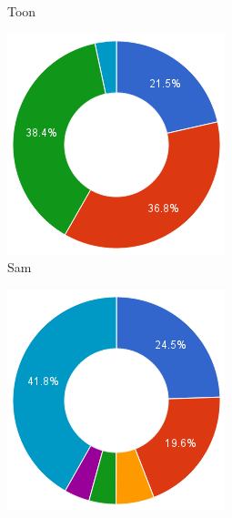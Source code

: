 \documentclass[eind]{penoverslag}
\begin{document}
\begin{figure}[h]
\begin{subfigure}[hb]{0.15\textwidth}
                \caption{Toon}
        \end{subfigure}%
        \begin{subfigure}[hb]{0.15\textwidth}
                \centering
                \includegraphics[width=\textwidth]{werk_Sam}
                \caption{Sam}
        \end{subfigure}%
        \begin{subfigure}[hb]{0.15\textwidth}
                \centering
                \includegraphics[width=\textwidth]{werk_Sophie}

\end{subfigure}
\end{figure}
\end{document}
